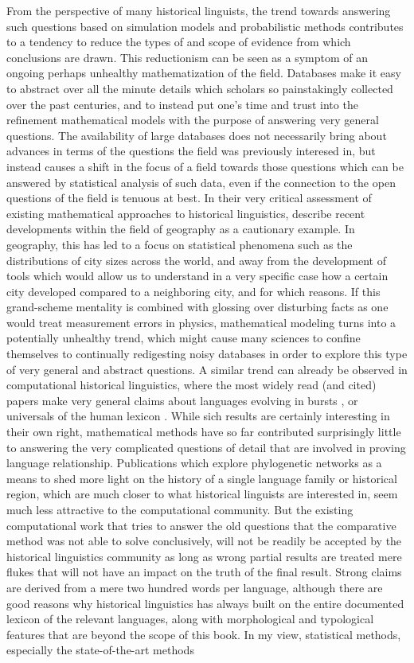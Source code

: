 From the perspective of many historical linguists, the trend towards answering such questions based on simulation models and probabilistic methods contributes to a tendency to reduce the types of and scope of evidence from which conclusions are drawn. This reductionism can be seen as a symptom of an ongoing perhaps unhealthy mathematization of the field. Databases make it easy to abstract over all the minute details which scholars so painstakingly collected over the past centuries, and to instead put one's time and trust into the refinement mathematical models with the purpose of answering very general questions. The availability of large databases does not necessarily bring about advances in terms of the questions the field was previously interesed in, but instead causes a shift in the focus of a field towards those questions which can be answered by statistical analysis of such data, even if the connection to the open questions of the field is tenuous at best. In their very critical assessment of existing mathematical approaches to historical linguistics, \cite{pereltsvaig_lewis_2015} describe recent developments within the field of geography as a cautionary example. In geography, this has led to a focus on statistical phenomena such as the distributions of city sizes across the world, and away from the development of tools which would allow us to understand in a very specific case how a certain city developed compared to a neighboring city, and for which reasons. If this grand-scheme mentality is combined with glossing over disturbing facts as one would treat measurement errors in physics, mathematical modeling turns into a potentially unhealthy trend, which might cause many sciences to confine themselves to continually redigesting noisy databases in order to explore this type of very general and abstract questions. A similar trend can already be observed in computational historical linguistics, where the most widely read (and cited) papers make very general claims about languages evolving in bursts \citet{atkinson_ea_2008}, or universals of the human lexicon \cite{youn_ea_2016}. While sich results are certainly interesting in their own right, mathematical methods have so far contributed surprisingly little to answering the very complicated questions of detail that are involved in proving language relationship. Publications which explore phylogenetic networks as a means to shed more light on the history of a single language family or historical region, which are much closer to what historical linguists are interested in, seem much less attractive to the computational community. But the existing computational work that tries to answer the old questions that the comparative method was not able to solve conclusively, will not be readily be accepted by the historical linguistics community as long as wrong partial results are treated mere flukes that will not have an impact on the truth of the final result. Strong claims are derived from a mere two hundred words per language, although there are good reasons why historical linguistics has always built on the entire documented lexicon of the relevant languages, along with morphological and typological features that are beyond the scope of this book. In my view, statistical methods, especially the state-of-the-art methods 